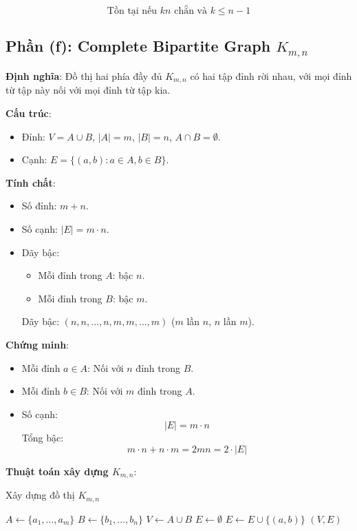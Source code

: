 \documentclass[a4paper,12pt]{article}
\theoremstyle{plain}
\theoremstyle{definition}
\begin{document}
\[
\boxed{\text{Tồn tại nếu } kn \text{ chẵn và } k \leq n-1}
\]

\subsection*{Phần (f): Complete Bipartite Graph \( K_{m,n} \)}

\textbf{Định nghĩa}: Đồ thị hai phía đầy đủ \( K_{m,n} \) có hai tập đỉnh rời nhau, với mọi đỉnh từ tập này nối với mọi đỉnh từ tập kia.

\textbf{Cấu trúc}:
\begin{itemize}
    \item Đỉnh: \( V = A \cup B \), \( |A| = m \), \( |B| = n \), \( A \cap B = \emptyset \).
    \item Cạnh: \( E = \{(a, b) : a \in A, b \in B\} \).
\end{itemize}

\textbf{Tính chất}:
\begin{itemize}
    \item Số đỉnh: \( m+n \).
    \item Số cạnh: \( |E| = m \cdot n \).
    \item Dãy bậc:
    \begin{itemize}
        \item Mỗi đỉnh trong \( A \): bậc \( n \).
        \item Mỗi đỉnh trong \( B \): bậc \( m \).
    \end{itemize}
    Dãy bậc: \( (n, n, \ldots, n, m, m, \ldots, m) \) (\( m \) lần \( n \), \( n \) lần \( m \)).
\end{itemize}

\textbf{Chứng minh}:
\begin{itemize}
    \item Mỗi đỉnh \( a \in A \): Nối với \( n \) đỉnh trong \( B \).
    \item Mỗi đỉnh \( b \in B \): Nối với \( m \) đỉnh trong \( A \).
    \item Số cạnh:
    \[
    |E| = m \cdot n
    \]
    Tổng bậc:
    \[
    m \cdot n + n \cdot m = 2mn = 2 \cdot |E|
    \]
\end{itemize}

\textbf{Thuật toán xây dựng \( K_{m,n} \)}:
\begin{algorithm}
\caption{Xây dựng đồ thị \( K_{m,n} \)}
\begin{algorithmic}
    \State $A \gets \{a_1, \ldots, a_m\}$
    \State $B \gets \{b_1, \ldots, b_n\}$
    \State $V \gets A \cup B$
    \State $E \gets \emptyset$
            \State $E \gets E \cup \{(a, b)\}$
        \EndFor
    \EndFor
    \State \Return $(V, E)$
\EndFunction
\end{algorithmic}
\end{algorithm}
\end{document}
